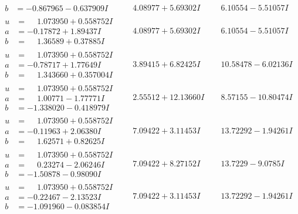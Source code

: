 \documentclass[1p]{elsarticle_modified}
\theoremstyle{definition}
\begin{document}
$$\begin{array}{c|c|c}
\begin{aligned}
b &= -0.867965 - 0.637909 I\end{aligned}
 & \phantom{-}4.08977 + 5.69302 I & \phantom{-}6.10554 - 5.51057 I \\ \hline\begin{aligned}
u &= \phantom{-}1.073950 + 0.558752 I \\
a &= -0.17872 + 1.89437 I \\
b &= \phantom{-}1.36589 + 0.37885 I\end{aligned}
 & \phantom{-}4.08977 + 5.69302 I & \phantom{-}6.10554 - 5.51057 I \\ \hline\begin{aligned}
u &= \phantom{-}1.073950 + 0.558752 I \\
a &= -0.78717 + 1.77649 I \\
b &= \phantom{-}1.343660 + 0.357004 I\end{aligned}
 & \phantom{-}3.89415 + 6.82425 I & \phantom{-}10.58478 - 6.02136 I \\ \hline\begin{aligned}
u &= \phantom{-}1.073950 + 0.558752 I \\
a &= \phantom{-}1.00771 - 1.77771 I \\
b &= -1.338020 - 0.418979 I\end{aligned}
 & \phantom{-}2.55512 + 12.13660 I & \phantom{-}8.57155 - 10.80474 I \\ \hline\begin{aligned}
u &= \phantom{-}1.073950 + 0.558752 I \\
a &= -0.11963 + 2.06380 I \\
b &= \phantom{-}1.62571 + 0.82625 I\end{aligned}
 & \phantom{-}7.09422 + 3.11453 I & \phantom{-}13.72292 - 1.94261 I \\ \hline\begin{aligned}
u &= \phantom{-}1.073950 + 0.558752 I \\
a &= \phantom{-}0.23274 - 2.06246 I \\
b &= -1.50878 - 0.98090 I\end{aligned}
 & \phantom{-}7.09422 + 8.27152 I & \phantom{-}13.7229 - 9.0785 I \\ \hline\begin{aligned}
u &= \phantom{-}1.073950 + 0.558752 I \\
a &= -0.22467 - 2.13523 I \\
b &= -1.091960 - 0.083854 I\end{aligned}
 & \phantom{-}7.09422 + 3.11453 I & \phantom{-}13.72292 - 1.94261 I \\ \hline\begin{aligned}

\end{aligned}
\end{array}$$
\end{document}
